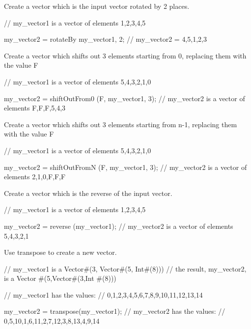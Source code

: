 Create a vector which is the input vector rotated by 2 places.
\begin{libverbatim}
     // my_vector1 is a vector of elements {1,2,3,4,5}
     
     my_vector2 = rotateBy {my_vector1, 2};
     // my_vector2 = {4,5,1,2,3}  
\end{libverbatim}


Create a vector which shifts out 3 elements starting from 0, replacing
them with the value F

\begin{libverbatim}
     // my_vector1 is a vector of elements {5,4,3,2,1,0}
     
     my_vector2 = shiftOutFrom0 (F, my_vector1, 3);
     // my_vector2 is a vector of elements {F,F,F,5,4,3}
\end{libverbatim}


Create a vector which shifts out 3 elements starting from n-1, replacing
them with the value F

\begin{libverbatim}
     // my_vector1 is a vector of elements {5,4,3,2,1,0}
     
     my_vector2 = shiftOutFromN (F, my_vector1, 3);
     // my_vector2 is a vector of elements {2,1,0,F,F,F}
\end{libverbatim}



Create a vector which is the reverse of the input vector.
\begin{libverbatim}
     // my_vector1 is a vector of elements {1,2,3,4,5}
     
     my_vector2 = reverse (my_vector1);
     // my_vector2 is a vector of elements {5,4,3,2,1}
\end{libverbatim}

Use transpose to create a new vector.
\begin{libverbatim}
     // my_vector1 is a Vector#(3, Vector#(5, Int#(8)))
     // the result, my_vector2, is a Vector #(5,Vector#(3,Int #(8))) 
     
     // my_vector1 has the values:
     // {{0,1,2,3,4},{5,6,7,8,9},{10,11,12,13,14}}
     
     my_vector2 = transpose(my_vector1);
     // my_vector2 has the values:
     // {{0,5,10},{1,6,11},{2,7,12},{3,8,13},{4,9,14}} 
\end{libverbatim}



